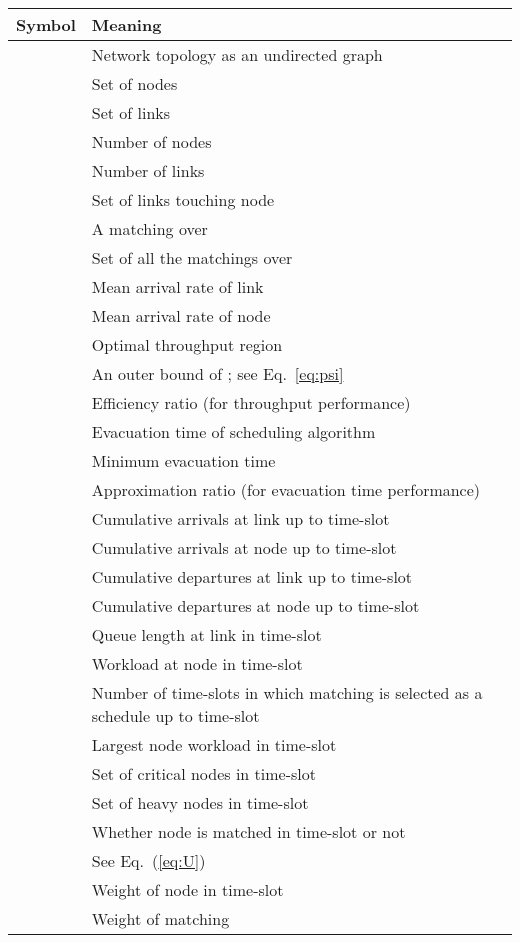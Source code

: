 \documentclass[10pt,journal,compsoc]{IEEEtran}
\newcommand{\HIGH}[1]{{\color{black}{#1}}}
\begin{document}
\begin{table}[!t]
\begin{tabular}{ c p{7cm}}
\toprule 
Symbol  & Meaning  \\
\hline 
   &  Network topology as an undirected graph       \\
   &  Set of nodes      \\
   &  Set of links     \\
   &  Number of nodes     \\
  &  Number of links     \\
    &  Set of links touching node       \\
    & A matching over  \\
    & Set of all the matchings over       \\
   &   Mean arrival rate of link    \\
   &  Mean arrival rate of node    \\
    &   Optimal throughput region    \\
   &   An outer bound of ; see Eq.~\eqref{eq:psi}   \\
    &  Efficiency ratio (for throughput performance)      \\
    &   Evacuation time of scheduling algorithm     \\
    &   Minimum evacuation time  \\
    &    Approximation ratio (for evacuation time performance)       \\  
     &    Cumulative arrivals at link  up to time-slot     \\
     &    Cumulative arrivals at node  up to time-slot   \\
    &  Cumulative departures at link  up to time-slot      \\
    &  Cumulative departures at node  up to time-slot    \\
    &    Queue length at link  in time-slot    \\ 
    &  Workload at node  in time-slot     \\
    &   Number of time-slots in which matching  is selected as a schedule up to time-slot    \\
    &  Largest node workload in time-slot \\
       &   Set of critical nodes in time-slot      \\
   	   &   Set of heavy nodes in time-slot       \\
   &  Whether node  is matched in time-slot  or not      \\
   &  See Eq.~(\ref{eq:U})     \\
     &    Weight of node  in time-slot    \\
 & Weight of matching    \\
\hline
\end{tabular}
\caption{\HIGH{Summary of notations.}}\label{tab:sys}
\label{tab:notations}
\end{table}
\end{document}
